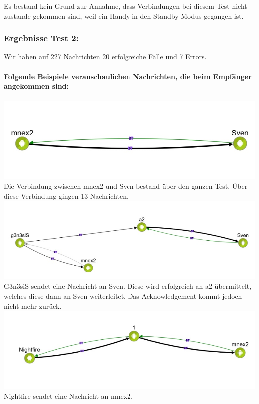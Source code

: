 Es bestand kein Grund zur Annahme, dass Verbindungen bei diesem Test
nicht zustande gekommen sind, weil ein Handy in den Standby Modus
gegangen ist.

\subsubsection{Ergebnisse Test 2:}\label{ergebnisse-test-2-1}

Wir haben auf 227 Nachrichten 20 erfolgreiche Fälle und 7 Errors.\\\\

\textbf{Folgende Beispiele veranschaulichen Nachrichten, die beim
Empfänger angekommen sind:}\\\\
\includegraphics[width=1.0\textwidth]{belege/grosstests/Bilder/Grosstest2/Test2Erfolg1.jpg}\\
Die Verbindung zwischen mnex2 und Sven bestand über den ganzen Test.
Über diese Verbindung gingen 13 Nachrichten.\\
\includegraphics[width=1.0\textwidth]{belege/grosstests/Bilder/Grosstest2/Test2Erfolg3.jpg}\\
G3n3siS sendet eine Nachricht an Sven. Diese wird erfolgreich an a2
übermittelt, welches diese dann an Sven weiterleitet. Das
Acknowledgement kommt jedoch nicht mehr zurück.\\
\includegraphics[width=1.0\textwidth]{belege/grosstests/Bilder/Grosstest2/Test2Erfolg4.jpg}\\
Nightfire sendet eine Nachricht an mnex2.\\

